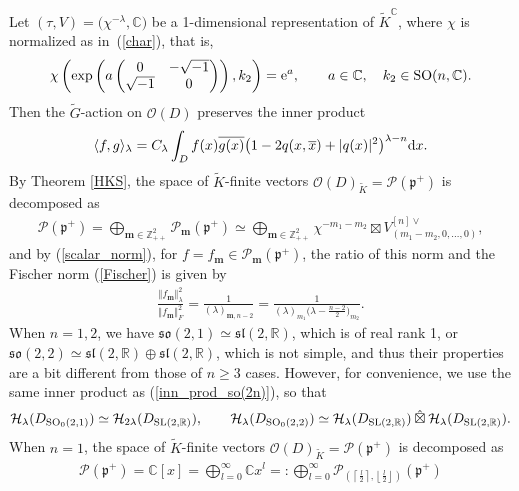 \documentclass[pdftex]{sigma}
\numberwithin{equation}{section}
\newcommand{\bm}{\mathbf{m}}
\newcommand{\BZ}{\mathbb{Z}}
\newcommand{\BR}{\mathbb{R}}
\newcommand{\BC}{\mathbb{C}}
\newcommand{\fp}{\mathfrak{p}}
\newcommand{\cH}{\mathcal{H}}
\newcommand{\cO}{\mathcal{O}}
\newcommand{\cP}{\mathcal{P}}
\newcommand{\hboxtimes}{\mathbin{\hat{\boxtimes}}}
\begin{document}
Let $(\tau,V)=\big(\chi^{-\lambda},\BC\big)$ be a 1-dimensional representation of $\tilde{K}^\BC$,
where $\chi$ is normalized as in~(\ref{char}), that is,
\begin{gather}\label{chi_so(2n)}
\chi\left(\exp\left(a\begin{pmatrix}0&-\sqrt{-1}\\\sqrt{-1}&0\end{pmatrix}\right),k_2\right)={\rm e}^a,
\qquad a\in\BC,\quad k_2\in \operatorname{SO}(n,\BC).
\end{gather}
Then the $\tilde{G}$-action on $\cO(D)$ preserves the inner product
\begin{gather}\label{inn_prod_so(2n)}
\langle f,g\rangle_\lambda=C_\lambda\int_D f(x)\overline{g(x)}\big(1-2q(x,\overline{x})+|q(x)|^2\big)^{\lambda-n}{\rm d}x.
\end{gather}
By Theorem \ref{HKS}, the space of $\tilde{K}$-finite vectors $\cO(D)_{\tilde{K}}=\cP(\fp^+)$ is decomposed as
\begin{gather}\label{poly_rank2}
\cP(\fp^+)=\bigoplus_{\bm\in\BZ_{++}^2}\cP_\bm(\fp^+)
\simeq\bigoplus_{\bm\in\BZ_{++}^2}\chi^{-m_1-m_2}\boxtimes V_{(m_1-m_2,0,\ldots,0)}^{[n]\vee},
\end{gather}
and by (\ref{scalar_norm}), for $f=f_\bm\in\cP_\bm(\fp^+)$, the ratio of this norm and the Fischer norm (\ref{Fischer}) is given by
\begin{gather}\label{norm_rank2}
\frac{\Vert f_\bm\Vert_\lambda^2}{\Vert f_\bm\Vert_F^2}=\frac{1}{(\lambda)_{\bm,n-2}}
=\frac{1}{(\lambda)_{m_1}\big(\lambda-\frac{n-2}{2}\big)_{m_2}}.
\end{gather}
When $n=1,2$, we have $\mathfrak{so}(2,1)\simeq\mathfrak{sl}(2,\BR)$, which is of real rank 1,
or $\mathfrak{so}(2,2)\simeq\mathfrak{sl}(2,\BR)\oplus\mathfrak{sl}(2,\BR)$,
which is not simple, and thus their properties are a bit different from those of $n\ge 3$ cases.
However, for convenience, we use the same inner product as (\ref{inn_prod_so(2n)}), so that
\begin{gather*} \cH_\lambda(D_{\operatorname{SO}_0(2,1)})\simeq \cH_{2\lambda}(D_{{\rm SL}(2,\BR)}),\qquad
\cH_\lambda(D_{\operatorname{SO}_0(2,2)})\simeq \cH_\lambda(D_{{\rm SL}(2,\BR)}) \hboxtimes \cH_\lambda(D_{{\rm SL}(2,\BR)}). \end{gather*}
When $n=1$, the space of $\tilde{K}$-finite vectors $\cO(D)_{\tilde{K}}=\cP(\fp^+)$ is decomposed as
\begin{gather*} \cP(\fp^+)=\BC[x]=\bigoplus_{l=0}^\infty\BC x^l
=:\bigoplus_{l=0}^\infty\cP_{\left(\left\lceil\frac{l}{2}\right\rceil,\left\lfloor\frac{l}{2}\right\rfloor\right)}(\fp^+) \end{gather*}
\end{document}
